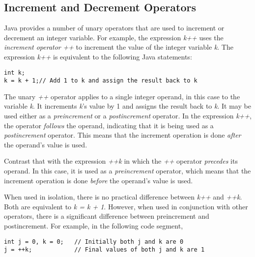 

\subsection{Increment and Decrement Operators}
\noindent Java provides a number of unary operators that are used to increment
or decrement an integer variable.   For example, the expression
{\it k++} uses the {\it increment operator}
{\it ++} to increment the value of the integer variable {\it k}.  The
expression {\it k++} is equivalent to the following Java statements:

\begin{jjjlisting}
\begin{lstlisting}
int k;
k = k + 1;// Add 1 to k and assign the result back to k
\end{lstlisting}
\end{jjjlisting}

\noindent The unary {\it ++} operator applies to
a single integer operand, in this case to the variable {\it k}. It
increments {\it k}'s value by 1 and assigns the result back to {\it k}. It may
be used either as a {\it preincrement} or a 
{\it postincrement} operator.  In the expression
{\it k++}, the operator {\it follows} the operand, indicating that it is
being used as a {\it postincrement} operator.  This means that the
increment operation is done {\it after} the operand's value is used.

Contrast that with the expression {\it ++k} in which the {\it ++}
operator {\it precedes} its operand.  In this case, it is used as a {\it
preincrement} operator, which means that the increment operation is
done {\it before} the operand's value is used.

When used in isolation, there is no practical difference between
{\it k++} and {\it ++k}.  Both are equivalent to {\it k = k + 1}. However,
when used in conjunction with other operators, there is a significant
difference between preincrement and postincrement.  For example, in the
following code segment,


\begin{jjjlisting}
\begin{lstlisting}
int j = 0, k = 0;   // Initially both j and k are 0
j = ++k;            // Final values of both j and k are 1
\end{lstlisting}
\end{jjjlisting}

